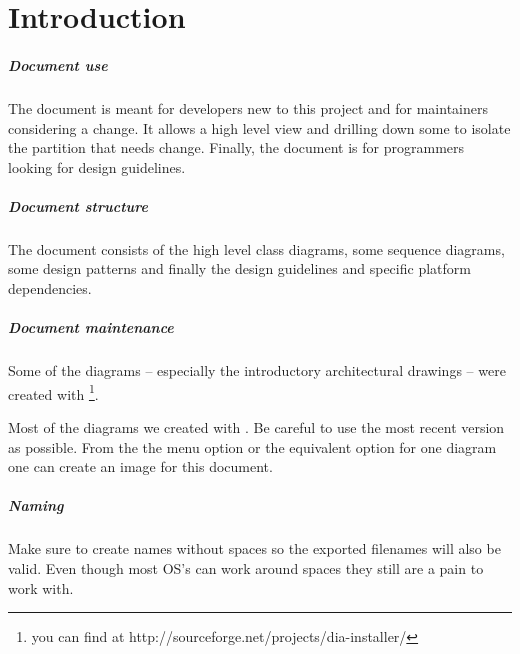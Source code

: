 \chapter{Introduction}

\paragraph{Document use} The document is meant for
developers new to this project and for maintainers
considering a change. It allows a high level view 
and drilling down some to isolate the 
partition that needs change. Finally, the document
is for programmers looking for design guidelines.

\paragraph{Document structure} The document consists
of the high level class diagrams, some sequence diagrams,
some design patterns and finally the design guidelines and 
specific platform dependencies.

\paragraph{Document maintenance} Some of the diagrams -- especially 
the introductory architectural drawings -- were created with \footnote{you 
can find  at http://sourceforge.net/projects/dia-installer/}.

Most of the  diagrams we created with . Be careful to use the most 
recent version as possible. From the the menu option  or the equivalent option for one diagram one can create an image for
this document.

\paragraph{Naming} Make sure to create names without spaces so the exported filenames
will also be valid. Even though most OS's can work around spaces they
still are a pain to work with. 


